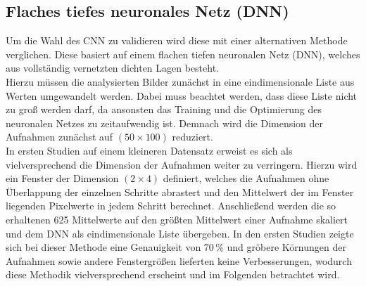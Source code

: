 \subsection{Flaches tiefes neuronales Netz (DNN)}

Um die Wahl des CNN zu validieren wird diese mit einer alternativen Methode verglichen. Diese basiert auf einem flachen tiefen neuronalen Netz (DNN), welches aus vollständig vernetzten dichten Lagen besteht. \\
Hierzu müssen die analysierten Bilder zunächst in eine eindimensionale Liste aus Werten umgewandelt werden. Dabei muss beachtet werden, dass diese Liste nicht zu gro{\ss} werden darf, da ansonsten das Training und die Optimierung des neuronalen Netzes zu zeitaufwendig ist. Demnach wird die Dimension der Aufnahmen zunächst auf $(50\times 100)$ reduziert.\\
In ersten Studien auf einem kleineren Datensatz erweist es sich als vielversprechend die Dimension der Aufnahmen weiter zu verringern. Hierzu wird ein Fenster der Dimension $(2\times 4)$ definiert, welches die Aufnahmen ohne Überlappung der einzelnen Schritte abrastert und den Mittelwert der im Fenster liegenden Pixelwerte in jedem Schritt berechnet. Anschlie{\ss}end werden die so erhaltenen 625 Mittelwerte auf den grö{\ss}ten Mittelwert einer Aufnahme skaliert und dem DNN als eindimensionale Liste übergeben. In den ersten Studien zeigte sich bei dieser Methode eine Genauigkeit von $70\,\%$ und gröbere Körnungen der Aufnahmen sowie andere Fenstergrö{\ss}en lieferten keine Verbesserungen, wodurch diese Methodik vielversprechend erscheint und im Folgenden betrachtet wird. \\
